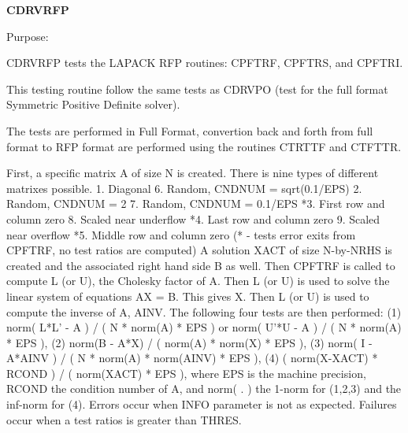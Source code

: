 {\bfseries C\+D\+R\+V\+R\+F\+P} 

\begin{DoxyParagraph}{Purpose\+: }
\begin{DoxyVerb} CDRVRFP tests the LAPACK RFP routines:
     CPFTRF, CPFTRS, and CPFTRI.

 This testing routine follow the same tests as CDRVPO (test for the full
 format Symmetric Positive Definite solver).

 The tests are performed in Full Format, convertion back and forth from
 full format to RFP format are performed using the routines CTRTTF and
 CTFTTR.

 First, a specific matrix A of size N is created. There is nine types of 
 different matrixes possible.
  1. Diagonal                        6. Random, CNDNUM = sqrt(0.1/EPS)
  2. Random, CNDNUM = 2              7. Random, CNDNUM = 0.1/EPS
 *3. First row and column zero       8. Scaled near underflow
 *4. Last row and column zero        9. Scaled near overflow
 *5. Middle row and column zero
 (* - tests error exits from CPFTRF, no test ratios are computed)
 A solution XACT of size N-by-NRHS is created and the associated right
 hand side B as well. Then CPFTRF is called to compute L (or U), the
 Cholesky factor of A. Then L (or U) is used to solve the linear system
 of equations AX = B. This gives X. Then L (or U) is used to compute the
 inverse of A, AINV. The following four tests are then performed:
 (1) norm( L*L' - A ) / ( N * norm(A) * EPS ) or
     norm( U'*U - A ) / ( N * norm(A) * EPS ),
 (2) norm(B - A*X) / ( norm(A) * norm(X) * EPS ),
 (3) norm( I - A*AINV ) / ( N * norm(A) * norm(AINV) * EPS ),
 (4) ( norm(X-XACT) * RCOND ) / ( norm(XACT) * EPS ),
 where EPS is the machine precision, RCOND the condition number of A, and
 norm( . ) the 1-norm for (1,2,3) and the inf-norm for (4).
 Errors occur when INFO parameter is not as expected. Failures occur when
 a test ratios is greater than THRES.\end{DoxyVerb}
 
\end{DoxyParagraph}

